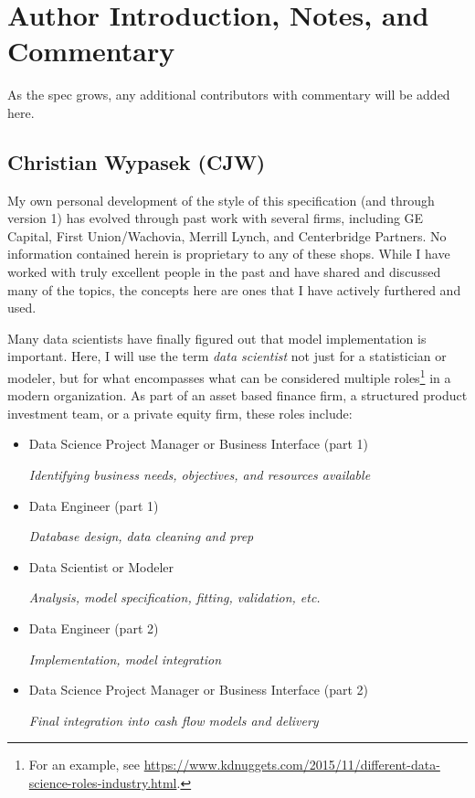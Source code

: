 \documentclass[10pt]{article}
\begin{document}
\ifcommentary

\section{Author Introduction, Notes, and Commentary\label{authors}}
As the spec grows, any additional contributors with commentary will be added here.

\subsection{Christian Wypasek (CJW)}

My own personal development of the style of this specification (and through version 1)  has evolved through past work with several firms, 
including GE Capital, First Union/Wachovia, Merrill Lynch, and Centerbridge Partners.   
No information contained herein is proprietary to any of these shops.
While I have worked with truly excellent people in the past and have shared and discussed many of the topics, 
the concepts here are ones that I have actively furthered and used.  

Many data scientists have finally figured out that model implementation is important.  Here, I will
use the term {\em data scientist} not just for a statistician or modeler, but for what encompasses what can be considered 
multiple roles\footnote{For an example, see
\url{https://www.kdnuggets.com/2015/11/different-data-science-roles-industry.html}.
} in a modern
organization.  
As part of an asset based finance firm, a structured product investment team, or a private
equity firm, these roles include:
\begin{itemize}
    \item Data Science Project Manager or Business Interface (part 1)\par
        {\em Identifying business needs, objectives, and resources available}
    \item Data Engineer (part 1)\par
        {\em Database design, data cleaning and prep}
    \item Data Scientist or Modeler\par
        {\em Analysis, model specification, fitting, validation, etc.}
    \item Data Engineer (part 2)\par
        {\em Implementation, model integration}
    \item Data Science Project Manager or Business Interface (part 2)\par
        {\em Final integration into cash flow models and delivery}
\end{itemize}
\end{document}
